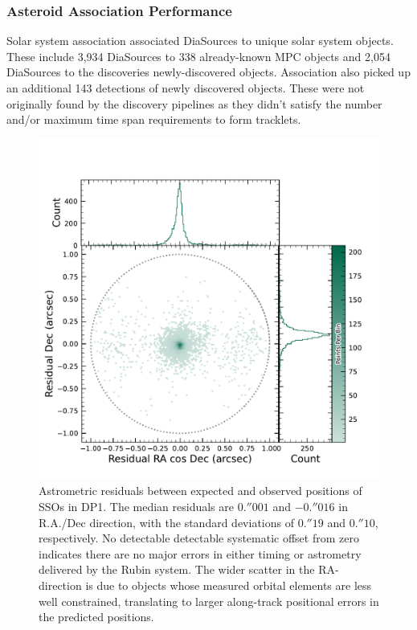 \subsubsection{Asteroid Association Performance}

Solar system association associated \nsolarsystemsources DiaSources to \nsolarsystemobjects unique solar system objects. 
These include 3,934 DiaSources to 338 already-known \gls{MPC} objects and 2,054 DiaSources to the \nnewasteroiddiscoveries discoveries newly-discovered objects.
Association also picked up an additional 143 detections of newly discovered objects. 
These were not originally found by the discovery pipelines as they didn't satisfy the number and/or maximum time span requirements to form tracklets.

\begin{figure}[htb!]
\centering
\includegraphics[width=0.98\linewidth]{figures/sso_residuals.pdf}
\caption{Astrometric residuals between expected and observed positions of SSOs in \gls{DP1}. The median residuals are $0.''001$ and $-0.''016$ in R.A./Dec direction, with the standard deviations of $0.''19$ and $0.''10$, respectively. No detectable detectable systematic offset from zero indicates there are no major errors in either timing or astrometry delivered by the Rubin system. The wider scatter in the RA-direction is due to objects whose measured orbital elements are less well constrained, translating to larger along-track positional errors in the predicted positions.}
\label{fig:sso_residuals}
\vspace{0.1cm}
\end{figure}


